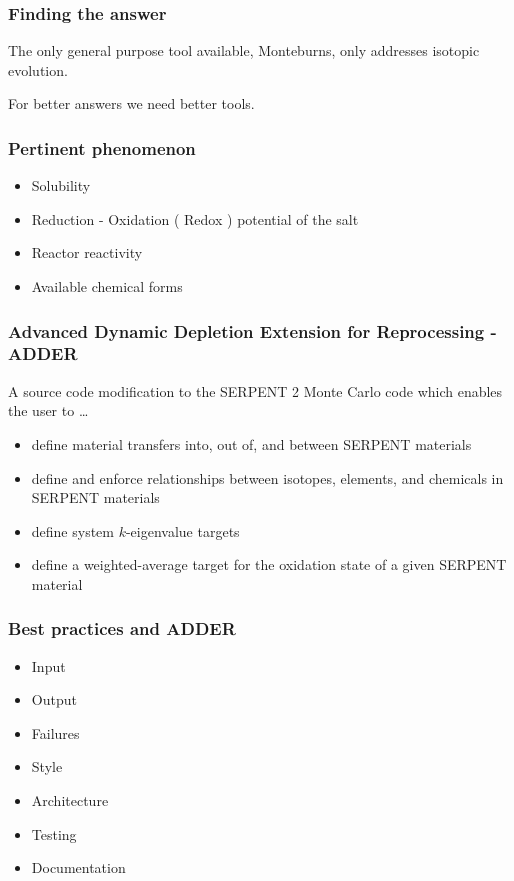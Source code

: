 \documentclass{beamer}
\begin{document}
\begin{frame}
\frametitle{Finding the answer}

The only general purpose tool available, Monteburns, only addresses isotopic
evolution.

\hspace{2cm}

For better answers we need better tools.

\end{frame}

\begin{frame}
\frametitle{Pertinent phenomenon}

    \begin{itemize}
        \item Solubility
        \item Reduction - Oxidation ( Redox ) potential of the salt
        \item Reactor reactivity
        \item Available chemical forms
    \end{itemize}

\end{frame}

\begin{frame}
\frametitle{Advanced Dynamic Depletion Extension for Reprocessing - ADDER}

A source code modification to the SERPENT 2 Monte Carlo code which enables the
user to \ldots

    \begin{itemize}
        \item define material transfers into, out of, and between SERPENT materials
        \item define and enforce relationships between isotopes, elements, and chemicals in SERPENT materials
        \item define system $k$-eigenvalue targets
        \item define a weighted-average target for the oxidation state of a given SERPENT material
    \end{itemize}

\end{frame}

\begin{frame}
\frametitle{Best practices and ADDER}

    \begin{itemize}
        \item Input
        \item Output
        \item Failures
        \item Style
        \item Architecture
        \item Testing
        \item Documentation
    \end{itemize}

\end{frame}
\end{document}
